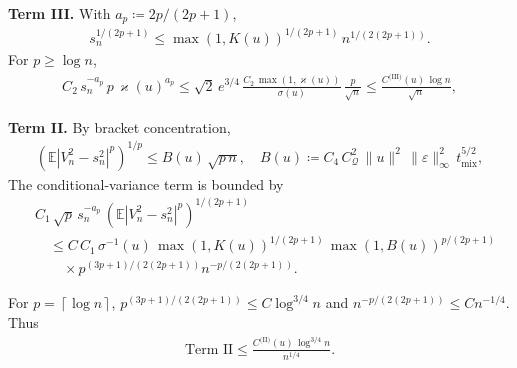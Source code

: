 \textbf{Term III.} With \(a_p \coloneqq 2 p / (2 p + 1)\),
\begin{equation}
\begin{aligned}
s_n^{1 / (2 p + 1)} \le \max(1, K(u))^{1 / (2 p + 1)} \, n^{1 / (2 (2 p + 1))}.
\end{aligned}
\end{equation}
For \(p \ge \log n\),
\begin{equation}
\begin{aligned}
C_2 \, s_n^{- a_p} \, p \, \varkappa(u)^{a_p}
  \le \sqrt{2} \, e^{3 / 4} \, \frac{C_2 \, \max(1, \varkappa(u))}{\sigma(u)} \, \frac{p}{\sqrt{n}}
  \le \frac{C^{\text{(III)}}(u) \, \log n}{\sqrt{n}},
\end{aligned}
\label{eq:term-III}
\end{equation}

\textbf{Term II.} By bracket concentration,
\begin{equation}
\begin{aligned}
(\mathbb{E} | V_n^2 - s_n^2 |^p)^{1 / p}
  \le B(u) \, \sqrt{p \, n},
\quad
B(u) \coloneqq C_4 \, C_{\mathcal{Q}}^2 \, \lVert  u  \rVert^2 \, \lVert  \varepsilon  \rVert_\infty^2 \, t_{\text{mix}}^{5 / 2},
\end{aligned}
\label{eq:Bu-def}
\end{equation}
The conditional-variance term is bounded by
\begin{equation}
\begin{aligned}
&C_1 \, \sqrt{p} \, s_n^{- a_p} \, (\mathbb{E} | V_n^2 - s_n^2 |^p)^{1 / (2 p + 1)} \\
&\quad\le C \, C_1 \, \sigma^{-1}(u)
        \, \max(1, K(u))^{1 / (2 p + 1)}
        \, \max(1, B(u))^{p / (2 p + 1)} \\
&\quad \quad \times p^{(3 p + 1) / (2 (2 p + 1))}
        n^{- p / (2 (2 p + 1))}.
\end{aligned}
\label{eq:term-II-1}
\end{equation}

For \(p = \left\lceil \log n \right\rceil\),
\(p^{(3 p + 1) / (2 (2 p + 1))} \le C \log^{3 / 4} n\) and
\(n^{- p / (2 (2 p + 1))} \le C n^{-1 / 4}\). Thus
\begin{equation}
\begin{aligned}
\text{Term II}
  \le \frac{C^{\text{(II)}}(u) \, \log^{3 / 4} n}{n^{1 / 4}}.
\end{aligned}
\label{eq:term-II}
\end{equation}

